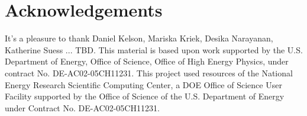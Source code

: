 \documentclass[12pt, letterpaper, preprint, comicneue]{aastex63}
\newcommand{\gr}{g{-}r}
\newcommand{\fnuv}{FUV{-}NUV}
\newcommand{\eda}{FADE}
\newcommand{\ch}[1]{{\color{orange}#1}}
\begin{document}
\begin{abstract}
\end{abstract}



 





\section*{Acknowledgements}
It's a pleasure to thank
    Daniel Kelson, 
    Mariska Kriek, 
    Desika Narayanan,
    Katherine Suess 
    ...
\ch{TBD}.
This material is based upon work supported by the U.S. Department of Energy,
Office of Science, Office of High Energy Physics, under contract No.
DE-AC02-05CH11231.  This project used resources of the National Energy Research
Scientific Computing Center, a DOE Office of Science User Facility supported by
the Office of Science of the U.S.  Department of Energy under Contract No.
DE-AC02-05CH11231. 

\appendix
%
% 
 


 
\end{document}
